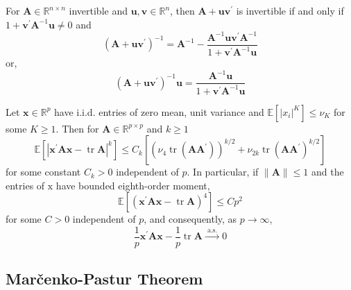 \begin{lemma} \label{lem:sherman-morrison}
    For $\mathbf{A}\in\mathbb{R}^{n\times n}$ invertible and $\mathbf{u},\mathbf{v}\in\mathbb{R}^{n}$, then $\mathbf{A}+\mathbf{u}\mathbf{v}^{\prime}$ is invertible if and only if $1+\mathbf{v}^{\prime}\mathbf{A}^{-1}\mathbf{u}\neq 0$ and
    \begin{equation}
        \left(\mathbf{A}+\mathbf{u}\mathbf{v}^{\prime}\right)^{-1}=\mathbf{A}^{-1}-\frac{\mathbf{A}^{-1}\mathbf{u}\mathbf{v}^{\prime}\mathbf{A}^{-1}}{1+\mathbf{v}^{\prime}\mathbf{A}^{-1}\mathbf{u}}
    \end{equation}
    or,
    \begin{equation}
        \left(\mathbf{A}+\mathbf{u}\mathbf{v}^{\prime}\right)^{-1}\mathbf{u}=\frac{\mathbf{A}^{-1}\mathbf{u}}{1+\mathbf{v}^{\prime}\mathbf{A}^{-1}\mathbf{u}}
    \end{equation}
\end{lemma}

\begin{lemma} \label{lem:quadratic-form-close-to-the-trace}
    Let $\mathbf{x} \in \mathbb{R}^{p}$ have i.i.d. entries of zero mean, unit variance and $\mathbb{E}\left[\left|x_{i}\right|^{K}\right] \leq \nu_{K}$ for some $K \geq 1 .$ Then for $\mathbf{A} \in \mathbb{R}^{p \times p}$ and $k \geq 1$
    $$
        \mathbb{E}\left[\left|\mathbf{x}^{\prime} \mathbf{A} \mathbf{x}-\operatorname{tr} \mathbf{A}\right|^{k}\right] \leq C_{k}\left[\left(\nu_{4} \operatorname{tr}\left(\mathbf{A} \mathbf{A}^{\prime}\right)\right)^{k / 2}+\nu_{2 k} \operatorname{tr}\left(\mathbf{A} \mathbf{A}^{\prime}\right)^{k / 2}\right]
    $$
    for some constant $C_{k}>0$ independent of $p .$ In particular, if $\|\mathbf{A}\| \leq 1$ and the entries of $\mathrm{x}$ have bounded eighth-order moment,
    $$
        \mathbb{E}\left[\left(\mathbf{x}^{\prime} \mathbf{A} \mathbf{x}-\operatorname{tr} \mathbf{A}\right)^{4}\right] \leq C p^{2}
    $$
    for some $C>0$ independent of $p$, and consequently, as $p \rightarrow \infty$,
    $$
        \frac{1}{p} \mathbf{x}^{\prime} \mathbf{A} \mathbf{x}-\frac{1}{p} \operatorname{tr} \mathbf{A} \stackrel{\text { a.s. }}{\longrightarrow} 0
    $$
\end{lemma}

\subsection{Marčenko-Pastur Theorem}

